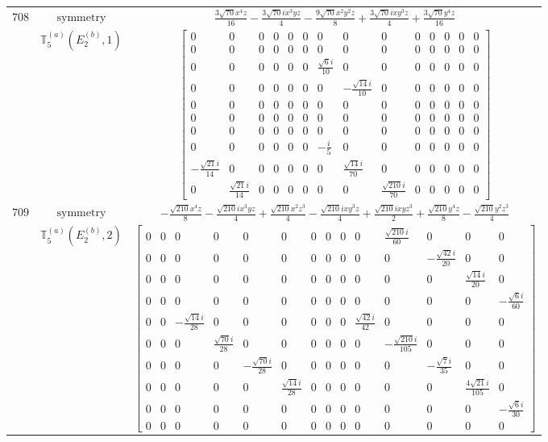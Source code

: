 \documentclass[fleqn,8pt,landscape]{jsarticle}
\begin{document}
\begin{longtable}{ccc}
$ 708 $ & $ \text{symmetry} $ & $ \frac{3 \sqrt{70} x^{4} z}{16} - \frac{3 \sqrt{70} i x^{3} y z}{4} - \frac{9 \sqrt{70} x^{2} y^{2} z}{8} + \frac{3 \sqrt{70} i x y^{3} z}{4} + \frac{3 \sqrt{70} y^{4} z}{16} $ \\
$  $ & $ \mathbb{T}_{5}^{(a)}(E_{2}^{(b)},1) $ & $ \begin{bmatrix} 0 & 0 & 0 & 0 & 0 & 0 & 0 & 0 & 0 & 0 & 0 & 0 & 0 & 0 \\ 0 & 0 & 0 & 0 & 0 & 0 & 0 & 0 & 0 & 0 & 0 & 0 & 0 & 0 \\ 0 & 0 & 0 & 0 & 0 & 0 & \frac{\sqrt{6} i}{10} & 0 & 0 & 0 & 0 & 0 & 0 & 0 \\ 0 & 0 & 0 & 0 & 0 & 0 & 0 & - \frac{\sqrt{14} i}{10} & 0 & 0 & 0 & 0 & 0 & 0 \\ 0 & 0 & 0 & 0 & 0 & 0 & 0 & 0 & 0 & 0 & 0 & 0 & 0 & 0 \\ 0 & 0 & 0 & 0 & 0 & 0 & 0 & 0 & 0 & 0 & 0 & 0 & 0 & 0 \\ 0 & 0 & 0 & 0 & 0 & 0 & 0 & 0 & 0 & 0 & 0 & 0 & 0 & 0 \\ 0 & 0 & 0 & 0 & 0 & 0 & - \frac{i}{5} & 0 & 0 & 0 & 0 & 0 & 0 & 0 \\ - \frac{\sqrt{21} i}{14} & 0 & 0 & 0 & 0 & 0 & 0 & \frac{\sqrt{14} i}{70} & 0 & 0 & 0 & 0 & 0 & 0 \\ 0 & \frac{\sqrt{21} i}{14} & 0 & 0 & 0 & 0 & 0 & 0 & \frac{\sqrt{210} i}{70} & 0 & 0 & 0 & 0 & 0 \end{bmatrix} $ \\ \hline
$ 709 $ & $ \text{symmetry} $ & $ - \frac{\sqrt{210} x^{4} z}{8} - \frac{\sqrt{210} i x^{3} y z}{4} + \frac{\sqrt{210} x^{2} z^{3}}{4} - \frac{\sqrt{210} i x y^{3} z}{4} + \frac{\sqrt{210} i x y z^{3}}{2} + \frac{\sqrt{210} y^{4} z}{8} - \frac{\sqrt{210} y^{2} z^{3}}{4} $ \\
$  $ & $ \mathbb{T}_{5}^{(a)}(E_{2}^{(b)},2) $ & $ \begin{bmatrix} 0 & 0 & 0 & 0 & 0 & 0 & 0 & 0 & 0 & 0 & \frac{\sqrt{210} i}{60} & 0 & 0 & 0 \\ 0 & 0 & 0 & 0 & 0 & 0 & 0 & 0 & 0 & 0 & 0 & - \frac{\sqrt{42} i}{20} & 0 & 0 \\ 0 & 0 & 0 & 0 & 0 & 0 & 0 & 0 & 0 & 0 & 0 & 0 & \frac{\sqrt{14} i}{20} & 0 \\ 0 & 0 & 0 & 0 & 0 & 0 & 0 & 0 & 0 & 0 & 0 & 0 & 0 & - \frac{\sqrt{6} i}{60} \\ 0 & 0 & - \frac{\sqrt{14} i}{28} & 0 & 0 & 0 & 0 & 0 & 0 & \frac{\sqrt{42} i}{42} & 0 & 0 & 0 & 0 \\ 0 & 0 & 0 & \frac{\sqrt{70} i}{28} & 0 & 0 & 0 & 0 & 0 & 0 & - \frac{\sqrt{210} i}{105} & 0 & 0 & 0 \\ 0 & 0 & 0 & 0 & - \frac{\sqrt{70} i}{28} & 0 & 0 & 0 & 0 & 0 & 0 & - \frac{\sqrt{7} i}{35} & 0 & 0 \\ 0 & 0 & 0 & 0 & 0 & \frac{\sqrt{14} i}{28} & 0 & 0 & 0 & 0 & 0 & 0 & \frac{4 \sqrt{21} i}{105} & 0 \\ 0 & 0 & 0 & 0 & 0 & 0 & 0 & 0 & 0 & 0 & 0 & 0 & 0 & - \frac{\sqrt{6} i}{30} \\ 0 & 0 & 0 & 0 & 0 & 0 & 0 & 0 & 0 & 0 & 0 & 0 & 0 & 0 \end{bmatrix} $ \\ \hline

\end{longtable}
\end{document}
